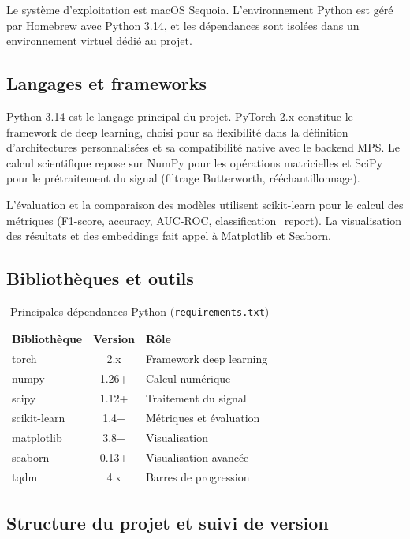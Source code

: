 \documentclass[a4paper,12pt]{report}
\begin{document}
Le système d'exploitation est macOS Sequoia. L'environnement Python est géré par Homebrew avec Python 3.14, et les dépendances sont isolées dans un environnement virtuel dédié au projet.

\subsection{Langages et frameworks}

Python 3.14 est le langage principal du projet. PyTorch 2.x constitue le framework de deep learning, choisi pour sa flexibilité dans la définition d'architectures personnalisées et sa compatibilité native avec le backend MPS. Le calcul scientifique repose sur NumPy pour les opérations matricielles et SciPy pour le prétraitement du signal (filtrage Butterworth, rééchantillonnage).

L'évaluation et la comparaison des modèles utilisent scikit-learn pour le calcul des métriques (F1-score, accuracy, AUC-ROC, classification\_report). La visualisation des résultats et des embeddings fait appel à Matplotlib et Seaborn.

\subsection{Bibliothèques et outils}

\begin{table}[H]
\centering
\small
\begin{tabularx}{0.88\textwidth}{|Y|c|Y|}
\hline
\textbf{Bibliothèque} & \textbf{Version} & \textbf{Rôle} \\
\hline
torch          & 2.x   & Framework deep learning \\
numpy          & 1.26+ & Calcul numérique \\
scipy          & 1.12+ & Traitement du signal \\
scikit-learn   & 1.4+  & Métriques et évaluation \\
matplotlib     & 3.8+  & Visualisation \\
seaborn        & 0.13+ & Visualisation avancée \\
tqdm           & 4.x   & Barres de progression \\
\hline
\end{tabularx}
\caption{Principales dépendances Python (\texttt{requirements.txt})}
\label{tab:dependencies}
\end{table}

\subsection{Structure du projet et suivi de version}
\end{document}
